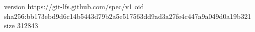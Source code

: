 version https://git-lfs.github.com/spec/v1
oid sha256:bb173ebd9d6c14b5443d79b2a5e517563dd9ad3a27fe4c447a9a049d0a19b321
size 312843
